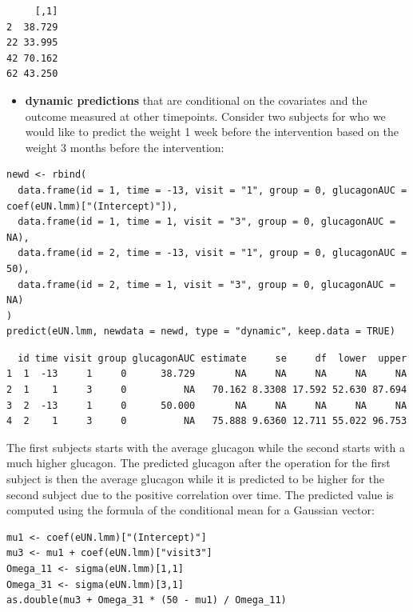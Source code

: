 \documentclass[12pt]{article}
\begin{document}
\begin{verbatim}
     [,1]
2  38.729
22 33.995
42 70.162
62 43.250
\end{verbatim}


\clearpage

\begin{itemize}
\item \textbf{dynamic predictions} that are conditional on the covariates and the
outcome measured at other timepoints. Consider two subjects for who
we would like to predict the weight 1 week before the intervention
based on the weight 3 months before the intervention:
\end{itemize}

\begin{lstlisting}
newd <- rbind(
  data.frame(id = 1, time = -13, visit = "1", group = 0, glucagonAUC = coef(eUN.lmm)["(Intercept)"]),
  data.frame(id = 1, time = 1, visit = "3", group = 0, glucagonAUC = NA),
  data.frame(id = 2, time = -13, visit = "1", group = 0, glucagonAUC = 50),
  data.frame(id = 2, time = 1, visit = "3", group = 0, glucagonAUC = NA)
)
predict(eUN.lmm, newdata = newd, type = "dynamic", keep.data = TRUE)
\end{lstlisting}

\begin{verbatim}
  id time visit group glucagonAUC estimate     se     df  lower  upper
1  1  -13     1     0      38.729       NA     NA     NA     NA     NA
2  1    1     3     0          NA   70.162 8.3308 17.592 52.630 87.694
3  2  -13     1     0      50.000       NA     NA     NA     NA     NA
4  2    1     3     0          NA   75.888 9.6360 12.711 55.022 96.753
\end{verbatim}


The first subjects starts with the average glucagon while the second
  starts with a much higher glucagon. The predicted glucagon after the
  operation for the first subject is then the average glucagon while
  it is predicted to be higher for the second subject due to the
  positive correlation over time. The predicted value is computed
  using the formula of the conditional mean for a Gaussian vector:
\lstset{language=r,label= ,caption= ,captionpos=b,numbers=none}
\begin{lstlisting}
mu1 <- coef(eUN.lmm)["(Intercept)"]
mu3 <- mu1 + coef(eUN.lmm)["visit3"]
Omega_11 <- sigma(eUN.lmm)[1,1]
Omega_31 <- sigma(eUN.lmm)[3,1]
as.double(mu3 + Omega_31 * (50 - mu1) / Omega_11)
\end{lstlisting}
\end{document}
